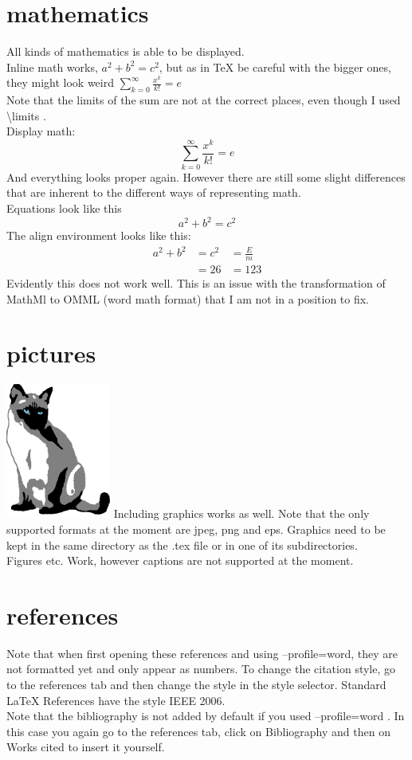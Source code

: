 \documentclass{article}
\begin{document}
\section{mathematics}
All kinds of mathematics is able to be displayed. \\ 
Inline math works, $a^2+b^2=c^2$, but as in TeX be careful with the bigger ones, they might look weird $\sum\limits_{k=0}^{\infty} \frac{x^k}{k!} =e$ \\
Note that the limits of the sum are not at the correct places, even though I used \textbackslash limits . \\ 
Display math: 
\[
\sum\limits_{k=0}^{\infty} \frac{x^k}{k!} =e
\]
And everything looks proper again. However there are still some slight differences that are inherent to the different ways of representing math. \\
Equations look like this
\begin{equation}
a^2+b^2=c^2
\end{equation}
The align environment looks like this: 
\begin{align}
a^2+b^2&=c^2&=\frac{E}{m} \\ 
&=26 &=123
\end{align}
Evidently this does not work well. This is an issue with the transformation of MathMl to OMML (word math format) that I am not in a position to fix. 
\section{pictures}
\includegraphics{image1.jpeg}
Including graphics works as well. Note that the only supported formats at the moment are jpeg, png and eps. Graphics need to be kept in the same directory as the .tex file or in one of its subdirectories.  \\ 

Figures etc. Work, however captions are not supported at the moment. 
\section{references}
\cite{book1} \cite{book2} \cite{booklet1,incollection1}
Note that when first opening these references and using --profile=word, they are not formatted yet and only appear as numbers. To change the citation style, go to the references tab and then change the style in the style selector. Standard LaTeX References have the style IEEE 2006.  \\ 
Note that the bibliography is not added by default if you used --profile=word . In this case you again go to the references tab, click on Bibliography and then on Works cited to insert it yourself. 

\end{document}
